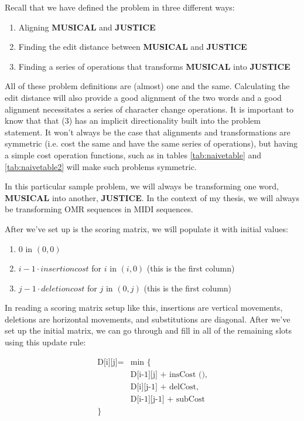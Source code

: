 Recall that we have defined the problem in three different ways:
\begin{enumerate}
\item Aligning \textbf{MUSICAL} and \textbf{JUSTICE}
\item Finding the edit distance between \textbf{MUSICAL} and \textbf{JUSTICE}
\item Finding a series of operations that transforms \textbf{MUSICAL} into \textbf{JUSTICE}
\end{enumerate}

All of these problem definitions are (almost) one and the same. Calculating the edit distance will also provide a good alignment of the two words and a good alignment necessitates a series of character change operations. It is important to know that that (3) has an implicit directionality built into the problem statement. It won't always be the case that alignments and transformations are symmetric (i.e. cost the same and have the same series of operations), but having a simple cost operation functions, such as in tables 
\ref{tab:naivetable}
 and 
 \ref{tab:naivetable2} 
 will make such problems symmetric. 

In this particular sample problem, we will always be transforming one word, \textbf{MUSICAL} into another, \textbf{JUSTICE}. In the context of my thesis, we will always be transforming OMR sequences in MIDI sequences. 

After we've set up is the scoring matrix, we will populate it with initial values: 
\begin{enumerate}
\item 0 in $(0,0)$
\item $i-1 \cdot insertion cost$ for $i$ in $(i, 0)$ (this is the first column) 
\item $j-1 \cdot deletion cost$ for $j$ in $(0, j)$ (this is the first column) 
\end{enumerate}
In reading a scoring matrix setup like this, insertions are vertical movements, deletions are horizontal movements, and substitutions are diagonal. 
After we've set up the initial matrix, we can go through and fill in all of the remaining slots using this update rule:


\begin{equation*}
\begin{split}
\text{D[i][j]} = &  \text{min \{ }\\
& \text{D[i-1][j] + insCost (),} \\
& \text{D[i][j-1] + delCost,} \\
& \text{D[i-1][j-1] + subCost} \\
\text{\}}
\end{split}
\end{equation*}


